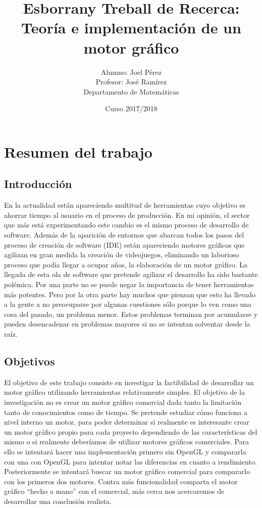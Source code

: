 \documentclass{article}
\title{Esborrany Treball de Recerca:\\Teoría e implementación de un motor gráfico}
\date{Curso 2017/2018}
\author{Alumno: Joel Pérez\\Profesor: José Ramírez\\Departamento de Matemáticas}
\begin{document}

\maketitle


\newpage


\tableofcontents

\newpage


\section{Resumen del trabajo}
\subsection{Introducción}
En la actualidad están apareciendo multitud de herramientas cuyo objetivo es ahorrar tiempo al usuario en el proceso de producción. En mi opinión, el sector que más está experimentando este cambio es el mismo proceso de desarrollo de software. Además de la aparición de entornos que abarcan todos los pasos del proceso de creación de software (IDE) están apareciendo motores gráficos que agilizan en gran medida la creación de videojuegos, eliminando un laborioso proceso que podía llegar a ocupar años, la elaboración de un motor gráfico.
\newline
La llegada de esta ola de software que pretende agilizar el desarrollo ha sido bastante polémica. Por una parte no se puede negar la importancia de tener herramientas más potentes. Pero por la otra parte hay muchos que piensan que esto ha llevado a la gente a no preocuparse por algunas cuestiones sólo porque lo ven como una cosa del pasado, un problema menor. Estos problemas terminan por acumularse y pueden desencadenar en problemas mayores si no se intentan solventar desde la raíz.
\subsection{Objetivos}
El objetivo de este trabajo consiste en investigar la factibilidad de desarrollar un motor gráfico utilizando herramientas relativamente simples. El objetivo de la investigación no es crear un motor gráfico comercial dada tanto la limitación tanto de conocimientos como de tiempo. Se pretende estudiar cómo funciona a nivel interno un motor, para poder determinar si realmente es interesante crear un motor gráfico propio para cada proyecto dependiendo de las características del mismo o si realmente deberíamos de utilizar motores gráficos comerciales.
\newline
Para ello se intentará hacer una implementación primero sin OpenGL y compararla con una con OpenGL para intentar notar las diferencias en cuanto a rendimiento. Posteriormente se intentará buscar un motor gráfico comercial para compararlo con los primeros dos motores. Contra más funcionalidad comparta el motor gráfico ``hecho a mano'' con el comercial, más cerca nos acercaremos de desarrollar una conclusión realista.
\end{document}
